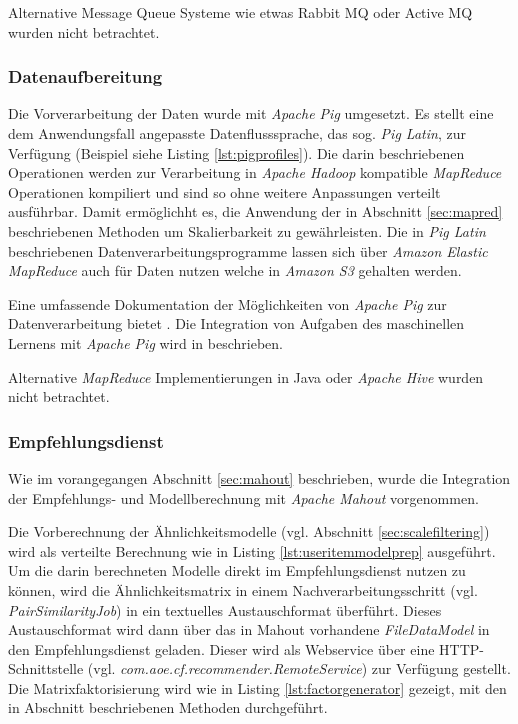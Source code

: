 Alternative Message Queue Systeme wie etwas Rabbit MQ oder Active MQ wurden nicht betrachtet.

\subsubsection{Datenaufbereitung} Die Vorverarbeitung der Daten wurde mit \textit{Apache Pig} umgesetzt. Es stellt eine dem Anwendungsfall angepasste Datenflusssprache, das sog. \textit{Pig Latin}, zur Verfügung (Beispiel siehe Listing \ref{lst:pigprofiles}). Die darin beschriebenen Operationen werden zur Verarbeitung in \textit{Apache Hadoop} kompatible \textit{MapReduce} Operationen kompiliert und sind so ohne weitere Anpassungen verteilt ausführbar.  Damit ermöglichht es, die Anwendung der in Abschnitt \ref{sec:mapred} beschriebenen Methoden um Skalierbarkeit zu gewährleisten. Die in \textit{Pig Latin} beschriebenen Datenverarbeitungsprogramme lassen sich über \textit{Amazon Elastic MapReduce} auch für Daten nutzen welche in \textit{Amazon S3} gehalten werden. \citep{Lin2012}

 

Eine umfassende Dokumentation der Möglichkeiten von \textit{Apache Pig} zur Datenverarbeitung bietet \citep{gates2011programming}. Die Integration von Aufgaben des maschinellen Lernens mit  \textit{Apache Pig} wird in  \citep{Lin2012} beschrieben.

Alternative \textit{MapReduce} Implementierungen in Java oder \textit{Apache Hive} wurden nicht betrachtet.

\subsubsection{Empfehlungsdienst} Wie im vorangegangen Abschnitt \ref{sec:mahout} beschrieben, wurde die Integration der Empfehlungs- und Modellberechnung mit \textit{Apache Mahout} vorgenommen.

Die Vorberechnung der Ähnlichkeitsmodelle (vgl. Abschnitt \ref{sec:scalefiltering}) wird als verteilte Berechnung wie in Listing \ref{lst:useritemmodelprep} ausgeführt. Um die darin berechneten Modelle direkt im Empfehlungsdienst nutzen zu können, wird die Ähnlichkeitsmatrix in einem Nachverarbeitungsschritt (vgl. \textit{PairSimilarityJob}) in ein textuelles Austauschformat überführt. Dieses Austauschformat wird dann über das in Mahout vorhandene \textit{FileDataModel} in den Empfehlungsdienst geladen. Dieser wird als Webservice über eine HTTP-Schnittstelle (vgl. \textit{com.aoe.cf.recommender.RemoteService}) zur Verfügung gestellt. Die Matrixfaktorisierung wird wie in Listing \ref{lst:factorgenerator} gezeigt, mit den in Abschnitt \label{sec:myrecommend} beschriebenen Methoden durchgeführt.

